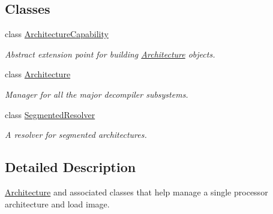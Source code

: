 \subsection*{Classes}
\begin{DoxyCompactItemize}
\item 
class \mbox{\hyperlink{class_architecture_capability}{Architecture\+Capability}}
\begin{DoxyCompactList}\small\item\em Abstract extension point for building \mbox{\hyperlink{class_architecture}{Architecture}} objects. \end{DoxyCompactList}\item 
class \mbox{\hyperlink{class_architecture}{Architecture}}
\begin{DoxyCompactList}\small\item\em Manager for all the major decompiler subsystems. \end{DoxyCompactList}\item 
class \mbox{\hyperlink{class_segmented_resolver}{Segmented\+Resolver}}
\begin{DoxyCompactList}\small\item\em A resolver for segmented architectures. \end{DoxyCompactList}\end{DoxyCompactItemize}


\subsection{Detailed Description}
\mbox{\hyperlink{class_architecture}{Architecture}} and associated classes that help manage a single processor architecture and load image. 

